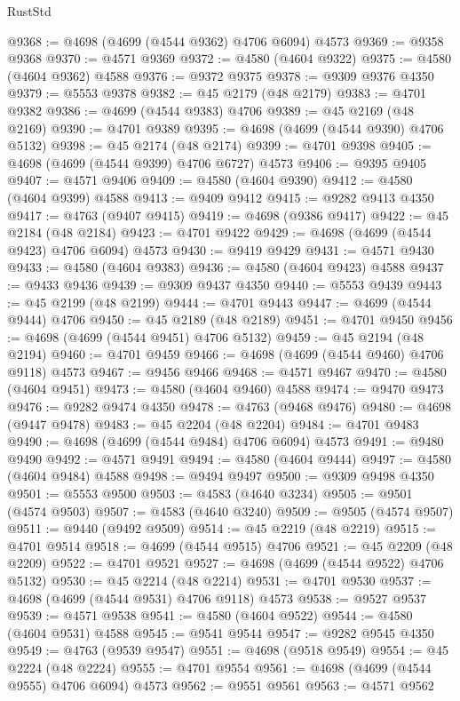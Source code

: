 \begin{lexlean}{RustStd}
\begin{coremodule}
@9368 := @4698 (@4699 (@4544 @9362) @4706 @6094) @4573
@9369 := @9358 @9368
@9370 := @4571 @9369
@9372 := @4580 (@4604 @9322)
@9375 := @4580 (@4604 @9362) @4588
@9376 := @9372 @9375
@9378 := @9309 @9376 @4350
@9379 := @5553 @9378
@9382 := @45 @2179 (@48 @2179)
@9383 := @4701 @9382
@9386 := @4699 (@4544 @9383) @4706
@9389 := @45 @2169 (@48 @2169)
@9390 := @4701 @9389
@9395 := @4698 (@4699 (@4544 @9390) @4706 @5132)
@9398 := @45 @2174 (@48 @2174)
@9399 := @4701 @9398
@9405 := @4698 (@4699 (@4544 @9399) @4706 @6727) @4573
@9406 := @9395 @9405
@9407 := @4571 @9406
@9409 := @4580 (@4604 @9390)
@9412 := @4580 (@4604 @9399) @4588
@9413 := @9409 @9412
@9415 := @9282 @9413 @4350
@9417 := @4763 (@9407 @9415)
@9419 := @4698 (@9386 @9417)
@9422 := @45 @2184 (@48 @2184)
@9423 := @4701 @9422
@9429 := @4698 (@4699 (@4544 @9423) @4706 @6094) @4573
@9430 := @9419 @9429
@9431 := @4571 @9430
@9433 := @4580 (@4604 @9383)
@9436 := @4580 (@4604 @9423) @4588
@9437 := @9433 @9436
@9439 := @9309 @9437 @4350
@9440 := @5553 @9439
@9443 := @45 @2199 (@48 @2199)
@9444 := @4701 @9443
@9447 := @4699 (@4544 @9444) @4706
@9450 := @45 @2189 (@48 @2189)
@9451 := @4701 @9450
@9456 := @4698 (@4699 (@4544 @9451) @4706 @5132)
@9459 := @45 @2194 (@48 @2194)
@9460 := @4701 @9459
@9466 := @4698 (@4699 (@4544 @9460) @4706 @9118) @4573
@9467 := @9456 @9466
@9468 := @4571 @9467
@9470 := @4580 (@4604 @9451)
@9473 := @4580 (@4604 @9460) @4588
@9474 := @9470 @9473
@9476 := @9282 @9474 @4350
@9478 := @4763 (@9468 @9476)
@9480 := @4698 (@9447 @9478)
@9483 := @45 @2204 (@48 @2204)
@9484 := @4701 @9483
@9490 := @4698 (@4699 (@4544 @9484) @4706 @6094) @4573
@9491 := @9480 @9490
@9492 := @4571 @9491
@9494 := @4580 (@4604 @9444)
@9497 := @4580 (@4604 @9484) @4588
@9498 := @9494 @9497
@9500 := @9309 @9498 @4350
@9501 := @5553 @9500
@9503 := @4583 (@4640 @3234)
@9505 := @9501 (@4574 @9503)
@9507 := @4583 (@4640 @3240)
@9509 := @9505 (@4574 @9507)
@9511 := @9440 (@9492 @9509)
@9514 := @45 @2219 (@48 @2219)
@9515 := @4701 @9514
@9518 := @4699 (@4544 @9515) @4706
@9521 := @45 @2209 (@48 @2209)
@9522 := @4701 @9521
@9527 := @4698 (@4699 (@4544 @9522) @4706 @5132)
@9530 := @45 @2214 (@48 @2214)
@9531 := @4701 @9530
@9537 := @4698 (@4699 (@4544 @9531) @4706 @9118) @4573
@9538 := @9527 @9537
@9539 := @4571 @9538
@9541 := @4580 (@4604 @9522)
@9544 := @4580 (@4604 @9531) @4588
@9545 := @9541 @9544
@9547 := @9282 @9545 @4350
@9549 := @4763 (@9539 @9547)
@9551 := @4698 (@9518 @9549)
@9554 := @45 @2224 (@48 @2224)
@9555 := @4701 @9554
@9561 := @4698 (@4699 (@4544 @9555) @4706 @6094) @4573
@9562 := @9551 @9561
@9563 := @4571 @9562

\end{coremodule}
\end{lexlean}
